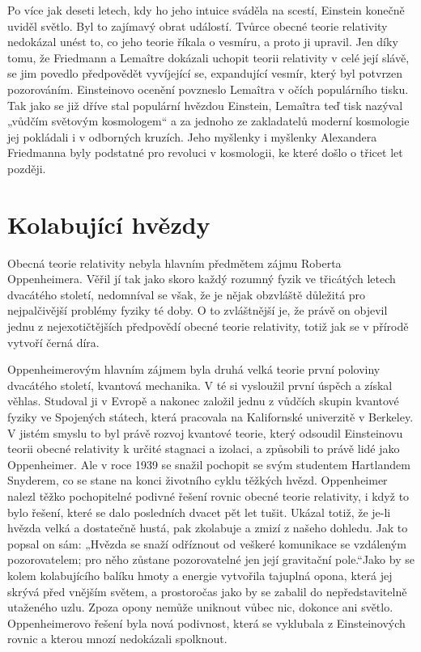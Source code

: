   Po více jak deseti letech, kdy ho jeho intuice sváděla na scestí, Einstein konečně uviděl světlo.
  Byl to zajímavý obrat událostí. Tvůrce obecné teorie relativity nedokázal unést to, co jeho teorie
  říkala o vesmíru, a proto ji upravil. Jen díky tomu, že Friedmann a Lemaître dokázali uchopit
  teorii relativity v celé její slávě, se jim povedlo předpovědět vyvíjející se, expandující vesmír,
  který byl potvrzen pozorováním. Einsteinovo ocenění povzneslo Lemaîtra v očích populárního tisku.
  Tak jako se již dříve stal populární hvězdou Einstein, Lemaîtra teď tisk nazýval „vůdčím světovým
  kosmologem“ a za jednoho ze zakladatelů moderní kosmologie jej pokládali i v odborných kruzích.
  Jeho myšlenky i myšlenky Alexandera Friedmanna byly podstatné pro revoluci v kosmologii, ke které
  došlo o třicet let později.

\section{Kolabující hvězdy}\label{kulIchIIIsecV} 
  Obecná teorie relativity nebyla hlavním předmětem zájmu Roberta Oppenheimera. Věřil jí tak jako
  skoro každý rozumný fyzik ve třicátých letech dvacátého století, nedomníval se však, že je nějak
  obzvláště důležitá pro nejpalčivější problémy fyziky té doby. O to zvláštnější je, že právě on
  objevil jednu z nejexotičtějších předpovědí obecné teorie relativity, totiž jak se v přírodě
  vytvoří černá díra. 
  
  Oppenheimerovým hlavním zájmem byla druhá velká teorie první poloviny dvacátého století, kvantová
  mechanika. V té si vysloužil první úspěch a získal věhlas. Studoval ji v Evropě a nakonec založil
  jednu z vůdčích skupin kvantové fyziky ve Spojených státech, která pracovala na Kalifornské
  univerzitě v Berkeley. V jistém smyslu to byl právě rozvoj kvantové teorie, který odsoudil
  Einsteinovu teorii obecné relativity k určité stagnaci a izolaci, a způsobili to právě lidé jako
  Oppenheimer. Ale v roce 1939 se snažil pochopit se svým studentem Hartlandem Snyderem, co se stane
  na konci životního cyklu těžkých hvězd. Oppenheimer nalezl těžko pochopitelné podivné řešení
  rovnic obecné teorie relativity, i když to bylo řešení, které se dalo posledních dvacet pět let
  tušit. Ukázal totiž, že je-li hvězda velká a dostatečně hustá, pak zkolabuje a zmizí z našeho
  dohledu. Jak to popsal on sám: „Hvězda se snaží odříznout od veškeré komunikace se vzdáleným
  pozorovatelem; pro něho zůstane pozorovatelné jen její gravitační pole.“Jako by se kolem
  kolabujícího balíku hmoty a energie vytvořila tajuplná opona, která jej skrývá před vnějším
  světem, a prostoročas jako by se zabalil do nepředstavitelně utaženého uzlu. Zpoza opony nemůže
  uniknout vůbec nic, dokonce ani světlo. Oppenheimerovo řešení byla nová podivnost, která se
  vyklubala z Einsteinových rovnic a kterou mnozí nedokázali spolknout. 
  
